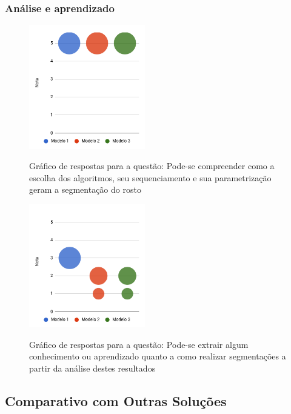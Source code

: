 \documentclass[12pt,oneside,a4paper,english,french,spanish,brazil,]{abntex2}
\begin{document}
\subsubsection{Análise e aprendizado}


\begin{figure}[ht]
\centering
\caption{Gráfico de respostas para a questão: Pode-se compreender como a escolha dos algoritmos, seu sequenciamento e sua parametrização geram a segmentação do rosto}
\includegraphics[width=0.45\textwidth]{imagens/Avaliacao_Juizes/Grafico_11.png}
\sourceAuthor{}
\label{fig:AJ_Qualidade_11}
\end{figure}

\begin{figure}[ht]
\centering
\caption{Gráfico de respostas para a questão: Pode-se extrair algum conhecimento ou aprendizado quanto a como realizar segmentações a partir da análise destes resultados}
\includegraphics[width=0.45\textwidth]{imagens/Avaliacao_Juizes/Grafico_12.png}
\sourceAuthor{}
\label{fig:AJ_Qualidade_12}
\end{figure}

\subsection{Comparativo com Outras Soluções}
\end{document}
